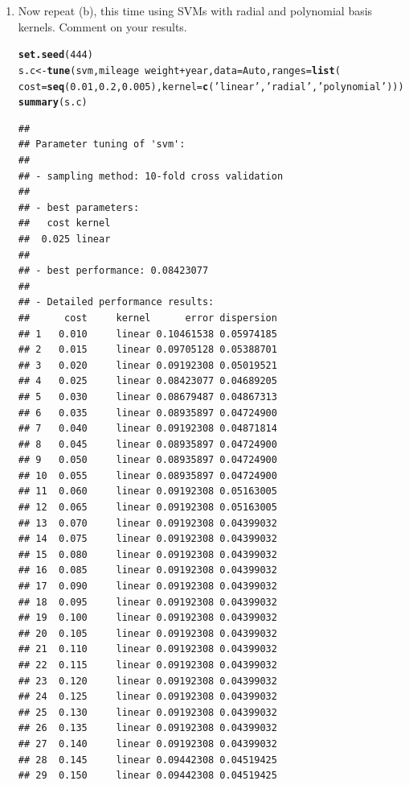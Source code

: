 \documentclass[12pt,fleqn]{article}\usepackage[]{graphicx}\usepackage[]{color}
\makeatletter
\newcommand{\hlnum}[1]{\textcolor[rgb]{0.686,0.059,0.569}{#1}}%
\newcommand{\hlstr}[1]{\textcolor[rgb]{0.192,0.494,0.8}{#1}}%
\newcommand{\hlopt}[1]{\textcolor[rgb]{0,0,0}{#1}}%
\newcommand{\hlstd}[1]{\textcolor[rgb]{0.345,0.345,0.345}{#1}}%
\newcommand{\hlkwb}[1]{\textcolor[rgb]{0.69,0.353,0.396}{#1}}%
\newcommand{\hlkwc}[1]{\textcolor[rgb]{0.333,0.667,0.333}{#1}}%
\newcommand{\hlkwd}[1]{\textcolor[rgb]{0.737,0.353,0.396}{\textbf{#1}}}%
\newenvironment{kframe}{%
 \def\at@end@of@kframe{}%
 \ifinner\ifhmode%
  \def\at@end@of@kframe{\end{minipage}}%
  \begin{minipage}{\columnwidth}%
 \fi\fi%
 \def\FrameCommand##1{\hskip\@totalleftmargin \hskip-\fboxsep
 \colorbox{shadecolor}{##1}\hskip-\fboxsep
     \hskip-\linewidth \hskip-\@totalleftmargin \hskip\columnwidth}%
 \MakeFramed {\advance\hsize-\width
   \@totalleftmargin\z@ \linewidth\hsize
   \@setminipage}}%
 {\par\unskip\endMakeFramed%
 \at@end@of@kframe}
\newenvironment{knitrout}{}{} %
\theoremstyle{definition}
\makeatother
\begin{document}
\begin{enumerate}[1.]
\begin{enumerate}
        \item Now repeat (b), this time using SVMs with radial and polynomial basis kernels. Comment on your results.
\begin{knitrout}
\color{fgcolor}\begin{kframe}
\begin{alltt}
\hlkwd{set.seed}\hlstd{(}\hlnum{444}\hlstd{)}
\hlstd{s.c} \hlkwb{<-} \hlkwd{tune}\hlstd{(svm, mileage} \hlopt{~} \hlstd{weight} \hlopt{+} \hlstd{year,} \hlkwc{data} \hlstd{= Auto,} \hlkwc{ranges} \hlstd{=} \hlkwd{list}\hlstd{(}
  \hlkwc{cost} \hlstd{=} \hlkwd{seq}\hlstd{(}\hlnum{0.01}\hlstd{,}\hlnum{0.2}\hlstd{,}\hlnum{0.005}\hlstd{),} \hlkwc{kernel} \hlstd{=} \hlkwd{c}\hlstd{(}\hlstr{'linear'}\hlstd{,}\hlstr{'radial'}\hlstd{,}\hlstr{'polynomial'}\hlstd{)))}
\hlkwd{summary}\hlstd{(s.c)}
\end{alltt}
\begin{verbatim}
## 
## Parameter tuning of 'svm':
## 
## - sampling method: 10-fold cross validation 
## 
## - best parameters:
##   cost kernel
##  0.025 linear
## 
## - best performance: 0.08423077 
## 
## - Detailed performance results:
##      cost     kernel      error dispersion
## 1   0.010     linear 0.10461538 0.05974185
## 2   0.015     linear 0.09705128 0.05388701
## 3   0.020     linear 0.09192308 0.05019521
## 4   0.025     linear 0.08423077 0.04689205
## 5   0.030     linear 0.08679487 0.04867313
## 6   0.035     linear 0.08935897 0.04724900
## 7   0.040     linear 0.09192308 0.04871814
## 8   0.045     linear 0.08935897 0.04724900
## 9   0.050     linear 0.08935897 0.04724900
## 10  0.055     linear 0.08935897 0.04724900
## 11  0.060     linear 0.09192308 0.05163005
## 12  0.065     linear 0.09192308 0.05163005
## 13  0.070     linear 0.09192308 0.04399032
## 14  0.075     linear 0.09192308 0.04399032
## 15  0.080     linear 0.09192308 0.04399032
## 16  0.085     linear 0.09192308 0.04399032
## 17  0.090     linear 0.09192308 0.04399032
## 18  0.095     linear 0.09192308 0.04399032
## 19  0.100     linear 0.09192308 0.04399032
## 20  0.105     linear 0.09192308 0.04399032
## 21  0.110     linear 0.09192308 0.04399032
## 22  0.115     linear 0.09192308 0.04399032
## 23  0.120     linear 0.09192308 0.04399032
## 24  0.125     linear 0.09192308 0.04399032
## 25  0.130     linear 0.09192308 0.04399032
## 26  0.135     linear 0.09192308 0.04399032
## 27  0.140     linear 0.09192308 0.04399032
## 28  0.145     linear 0.09442308 0.04519425
## 29  0.150     linear 0.09442308 0.04519425

\end{verbatim}
\end{kframe}
\end{knitrout}
\end{enumerate}
\end{enumerate}
\end{document}
